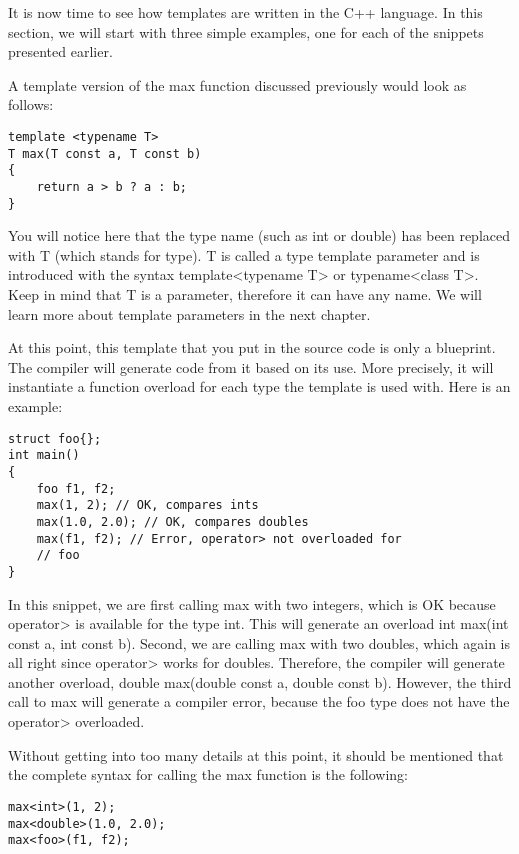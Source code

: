 It is now time to see how templates are written in the C++ language. In this section, we will start with three simple examples, one for each of the snippets presented earlier.

A template version of the max function discussed previously would look as follows:

\begin{lstlisting}[style=styleCXX]
template <typename T>
T max(T const a, T const b)
{
	return a > b ? a : b;
}
\end{lstlisting}

You will notice here that the type name (such as int or double) has been replaced with T (which stands for type). T is called a type template parameter and is introduced with the syntax template<typename T> or typename<class T>. Keep in mind that T is a parameter, therefore it can have any name. We will learn more about template parameters in the next chapter.

At this point, this template that you put in the source code is only a blueprint. The compiler will generate code from it based on its use. More precisely, it will instantiate a function overload for each type the template is used with. Here is an example:

\begin{lstlisting}[style=styleCXX]
struct foo{};
int main()
{
	foo f1, f2;
	max(1, 2); // OK, compares ints
	max(1.0, 2.0); // OK, compares doubles
	max(f1, f2); // Error, operator> not overloaded for
	// foo
}
\end{lstlisting}

In this snippet, we are first calling max with two integers, which is OK because operator> is available for the type int. This will generate an overload int max(int const a, int const b). Second, we are calling max with two doubles, which again is all right since operator> works for doubles. Therefore, the compiler will generate another overload, double max(double const a, double const b). However, the third call to max will generate a compiler error, because the foo type does not have the operator> overloaded.

Without getting into too many details at this point, it should be mentioned that the complete syntax for calling the max function is the following:

\begin{lstlisting}[style=styleCXX]
max<int>(1, 2);
max<double>(1.0, 2.0);
max<foo>(f1, f2);
\end{lstlisting}

